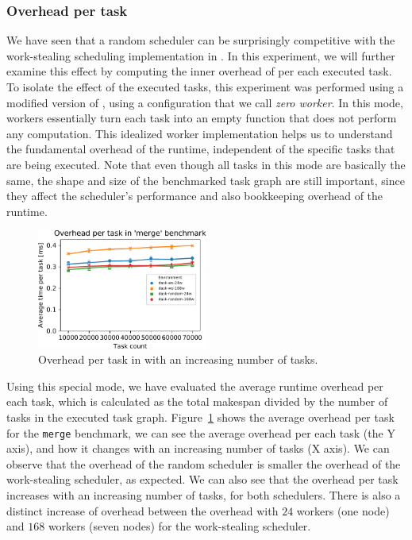 \subsubsection*{Overhead per task}
We have seen that a random scheduler can be surprisingly competitive with the work-stealing
scheduling implementation in \dask{}. In this experiment, we will further examine
this effect by computing the inner overhead of \dask{} per each executed task. To
isolate the effect of the executed tasks, this experiment was performed using a modified version of
\dask{}, using a configuration that we call \emph{zero worker}. In this mode,
\dask{} workers essentially turn each task into an empty function that does not
perform any computation. This idealized worker implementation helps us to understand the
fundamental overhead of the \dask{} runtime, independent of the specific tasks that
are being executed. Note that even though all tasks in this mode are basically the same, the shape
and size of the benchmarked task graph are still important, since they affect the scheduler's
performance and also bookkeeping overhead of the runtime.

\begin{figure}
	\centering
	\includegraphics[width=0.5\textwidth]{imgs/rsds/charts/dask-merge-task-scaling}
	\caption{Overhead per task in \dask{} with an increasing number of tasks.}
	\label{fig:dask-merge-task-scaling}
\end{figure}

Using this special mode, we have evaluated the average runtime overhead per each task, which is
calculated as the total makespan divided by the number of tasks in the executed task graph.
Figure~\ref{fig:dask-merge-task-scaling} shows the average overhead per task for the \texttt{merge}
benchmark, we can see the average overhead per each task (the Y axis), and how it changes with an
increasing number of tasks (X axis). We can observe that the overhead of the random scheduler is
smaller the overhead of the work-stealing scheduler, as expected. We can also see that the overhead
per task increases with an increasing number of tasks, for both schedulers. There is also a
distinct increase of overhead between the overhead with $24$ workers (one node)
and $168$ workers (seven nodes) for the work-stealing scheduler.

